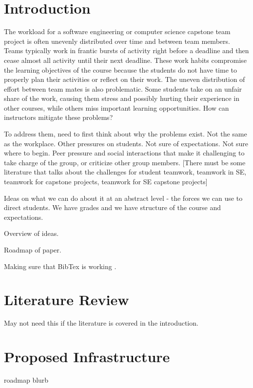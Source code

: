 \documentclass[10pt, conference]{IEEEtran}
\begin{document}
\section{Introduction} \label{SecIntro}

The workload for a software engineering or computer science capstone team
project is often unevenly distributed over time and between team members.  Teams
typically work in frantic bursts of activity right before a deadline and then
cease almost all activity until their next deadline.  These work habits
compromise the learning objectives of the course because the students do not
have time to properly plan their activities or reflect on their work.  The
uneven distribution of effort between team mates is also problematic.  Some
students take on an unfair share of the work, causing them stress and possibly
hurting their experience in other courses, while others miss important learning
opportunities.  How can instructors mitigate these problems?

To address them, need to first think about why the problems exist.  Not the same
as the workplace.  Other pressures on students.  Not sure of expectations.  Not
sure where to begin.  Peer pressure and social interactions that make it
challenging to take charge of the group, or criticize other group members.
[There must be some literature that talks about the challenges for student
teamwork, teamwork in SE, teamwork for capstone projects, teamwork for SE
capstone projects]

Ideas on what we can do about it at an abstract level - the forces we can use to
direct students.  We have grades and we have structure of the course and
expectations.

Overview of ideas.

Roadmap of paper.

Making sure that BibTex is working \cite{Smith2005}.

\section{Literature Review} \label{SecLitReview}
May not need this if the literature is covered in the introduction.

\section{Proposed Infrastructure} \label{SecInfrastruct}

roadmap blurb
\end{document}
